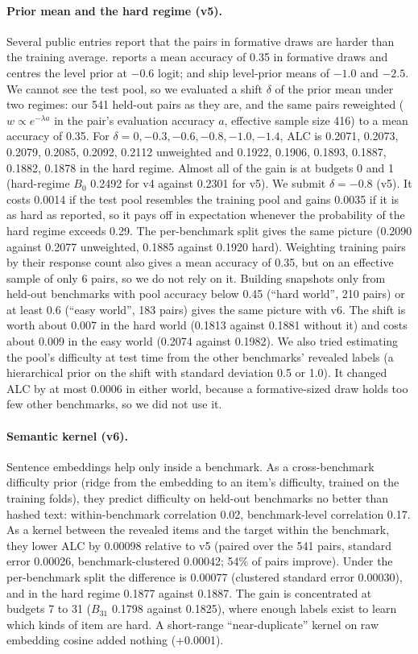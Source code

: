\documentclass{article}
\begin{document}
\paragraph{Prior mean and the hard regime (v5).} Several public entries report that the pairs in
formative draws are harder than the training average. \citet{gpirt} reports a mean accuracy of 0.35
in formative draws and centres the level prior at $-0.6$ logit; \citet{paiksca} and
\citet{doctawho} ship level-prior means of $-1.0$ and $-2.5$. We cannot see the test pool, so
we evaluated a shift $\delta$ of the prior mean under two regimes: our 541 held-out pairs as they
are, and the same pairs reweighted ($w\propto e^{-\lambda a}$ in the pair's evaluation accuracy $a$,
effective sample size 416) to a mean accuracy of 0.35. For $\delta = 0, -0.3, -0.6, -0.8, -1.0, -1.4$,
ALC is 0.2071, 0.2073, 0.2079, 0.2085, 0.2092, 0.2112 unweighted and 0.1922, 0.1906, 0.1893,
0.1887, 0.1882, 0.1878 in the hard regime. Almost all of the gain is at budgets 0 and 1 (hard-regime
$B_0$ 0.2492 for v4 against 0.2301 for v5). We submit $\delta=-0.8$ (v5). It costs 0.0014 if the test
pool resembles the training pool and gains 0.0035 if it is as hard as reported, so it pays off
in expectation whenever the probability of the hard regime exceeds 0.29. The per-benchmark split
gives the same picture (0.2090 against 0.2077 unweighted, 0.1885 against 0.1920 hard).
Weighting training pairs by their response count also gives a mean accuracy of 0.35, but on an
effective sample of only 6 pairs, so we do not rely on it. Building snapshots only from held-out benchmarks
with pool accuracy below 0.45 (``hard world'', 210 pairs) or at least 0.6 (``easy world'', 183
pairs) gives the same picture with v6. The shift is worth about 0.007 in the hard world (0.1813
against 0.1881 without it) and costs about 0.009 in the easy world (0.2074 against 0.1982). We also
tried estimating the pool's difficulty at test time from the other benchmarks' revealed labels
(a hierarchical prior on the shift with standard deviation 0.5 or 1.0). It changed ALC by at most
0.0006 in either world, because a formative-sized draw holds too few other benchmarks, so we did not
use it.

\paragraph{Semantic kernel (v6).} Sentence embeddings help only inside a benchmark. As a
cross-benchmark difficulty prior (ridge from the embedding to an item's difficulty, trained on the
training folds), they predict difficulty on held-out benchmarks no better than hashed text:
within-benchmark correlation 0.02, benchmark-level correlation 0.17. As a kernel between the
revealed items and the target within the benchmark, they lower ALC by 0.00098 relative to v5
(paired over the 541 pairs, standard error 0.00026, benchmark-clustered 0.00042; 54\% of pairs
improve). Under the per-benchmark split the difference is 0.00077 (clustered standard error 0.00030),
and in the hard regime 0.1877 against 0.1887. The gain is concentrated at budgets 7 to 31 ($B_{31}$
0.1798 against 0.1825), where enough labels exist to learn which kinds of item are hard. A
short-range ``near-duplicate'' kernel on raw embedding cosine added nothing (+0.0001).
\end{document}
